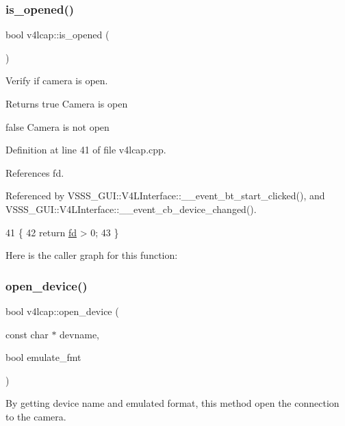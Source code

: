 \subsubsection{\texorpdfstring{is\+\_\+opened()}{is\_opened()}}
{\footnotesize\ttfamily bool v4lcap\+::is\+\_\+opened (\begin{DoxyParamCaption}{ }\end{DoxyParamCaption})}



Verify if camera is open. 

\begin{DoxyReturn}{Returns}
true Camera is open 

false Camera is not open 
\end{DoxyReturn}


Definition at line 41 of file v4lcap.\+cpp.



References fd.



Referenced by V\+S\+S\+S\+\_\+\+G\+U\+I\+::\+V4\+L\+Interface\+::\+\_\+\+\_\+event\+\_\+bt\+\_\+start\+\_\+clicked(), and V\+S\+S\+S\+\_\+\+G\+U\+I\+::\+V4\+L\+Interface\+::\+\_\+\+\_\+event\+\_\+cb\+\_\+device\+\_\+changed().


\begin{DoxyCode}
41                        \{
42     \textcolor{keywordflow}{return} \hyperlink{classv4lcap_a38109593bde997dad13b3a461569573d}{fd} > 0;
43 \}
\end{DoxyCode}
Here is the caller graph for this function\+:
\mbox{\label{classv4lcap_a1404aae893a64a8e8859d822a4dfb273}} 
\subsubsection{\texorpdfstring{open\+\_\+device()}{open\_device()}}
{\footnotesize\ttfamily bool v4lcap\+::open\+\_\+device (\begin{DoxyParamCaption}\item[{const char $\ast$}]{devname,  }\item[{bool}]{emulate\+\_\+fmt }\end{DoxyParamCaption})}



By getting device name and emulated format, this method open the connection to the camera. 


